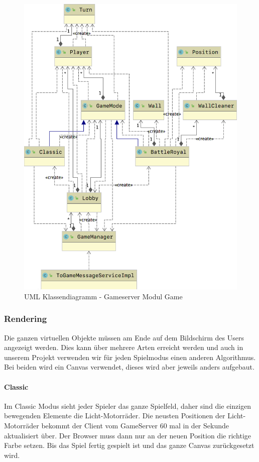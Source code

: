\documentclass[11pt,ngerman]{article}
\begin{document}
	\begin{figure}[H]
    	\centering
    	\includegraphics[scale=0.3]{figures/gameserver-uml/game-classes.png}
    	\caption{UML Klassendiagramm - Gameserver Modul Game}
    	\label{fig:UMLModulGame}
    \end{figure}

    \subsubsection{Rendering}
    Die ganzen virtuellen Objekte müssen am Ende auf dem Bildschirm des Users angezeigt werden. Dies kann über mehrere Arten erreicht werden und auch in unserem Projekt verwenden wir für jeden Spielmodus einen anderen Algorithmus. Bei beiden wird ein \Gls{Canvas} verwendet, dieses wird aber jeweils anders aufgebaut.

    \paragraph{Classic}
    Im Classic Modus sieht jeder Spieler das ganze Spielfeld, daher sind die einzigen bewegenden Elemente die Licht-Motorräder. Die neusten Positionen der Licht-Motorräder bekommt der Client vom GameServer 60 mal in der Sekunde aktualisiert über. Der Browser muss dann nur an der neuen Position die richtige Farbe setzen. Bis das Spiel fertig gespielt ist und das ganze \Gls{Canvas} zurückgesetzt wird.
\end{document}

